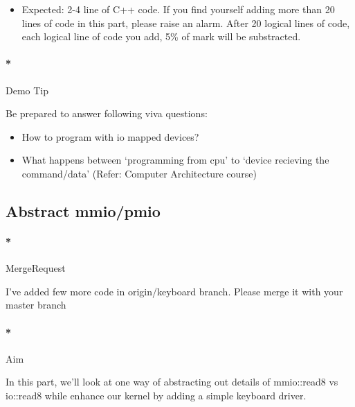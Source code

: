 \documentclass[]{article}
\newenvironment{Shaded}{}{}
\newcommand{\ExtensionTok}[1]{{#1}}
\newcommand{\NormalTok}[1]{{#1}}
\providecommand{\tightlist}{%
  \setlength{\itemsep}{0pt}\setlength{\parskip}{0pt}}
\let\oldparagraph\paragraph
\renewcommand{\paragraph}[1]{\oldparagraph{#1}\mbox{}}
\begin{document}
\begin{itemize}
\tightlist
\item
  Expected: 2-4 line of C++ code. If you find yourself adding more than
  20 lines of code in this part, please raise an alarm. After 20 logical
  lines of code, each logical line of code you add, 5\% of mark will be
  substracted.
\end{itemize}

\paragraph*{Demo Tip}\label{demo-tip-1}

Be prepared to answer following viva questions:

\begin{itemize}
\tightlist
\item
  How to program with io mapped devices?
\item
  What happens between `programming from cpu' to `device recieving the
  command/data' (Refer: Computer Architecture course)
\end{itemize}

\subsection{Abstract mmio/pmio}\label{abstract-mmiopmio}

\paragraph*{MergeRequest}\label{mergerequest-2}

I've added few more code in origin/keyboard branch. Please merge it with
your master branch

\begin{Shaded}
\end{Shaded}

\paragraph*{Aim}\label{aim-2}

In this part, we'll look at one way of abstracting out details of
mmio::read8 vs io::read8 while enhance our kernel by adding a simple
keyboard driver.
\end{document}

